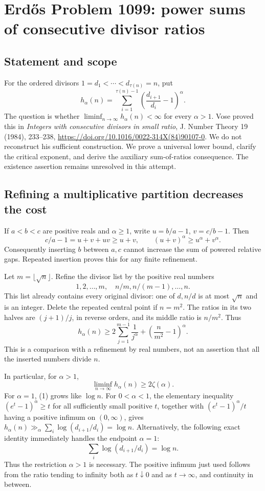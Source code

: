 \section*{Erd\H{o}s Problem 1099: power sums of consecutive divisor ratios}
\subsection*{Statement and scope}
For the ordered divisors $1=d_1<\cdots<d_{\tau(n)}=n$, put
\[
 h_\alpha(n)=\sum_{i=1}^{\tau(n)-1}\left(\frac{d_{i+1}}{d_i}-1\right)^\alpha.
\]
The question is whether $\liminf_{n\to\infty}h_\alpha(n)<\infty$ for every $\alpha>1$. Vose proved this in \emph{Integers with consecutive divisors in small ratio}, J. Number Theory 19 (1984), 233--238, \url{https://doi.org/10.1016/0022-314X(84)90107-0}. We do not reconstruct his sufficient construction. We prove a universal lower bound, clarify the critical exponent, and derive the auxiliary sum-of-ratios consequence. The existence assertion remains unresolved in this attempt.

\subsection*{Refining a multiplicative partition decreases the cost}
If $a<b<c$ are positive reals and $\alpha\ge1$, write $u=b/a-1$, $v=c/b-1$. Then
\[
 c/a-1=u+v+uv\ge u+v,\qquad (u+v)^\alpha\ge u^\alpha+v^\alpha.
\]
Consequently inserting $b$ between $a,c$ cannot increase the sum of powered relative gaps. Repeated insertion proves this for any finite refinement.

Let $m=\lfloor\sqrt n\rfloor$. Refine the divisor list by the positive real numbers
\[
 1,2,\ldots,m,\quad n/m,n/(m-1),\ldots,n.
\]
This list already contains every original divisor: one of $d,n/d$ is at most $\sqrt n$ and is an integer. Delete the repeated central point if $n=m^2$. The ratios in its two halves are $(j+1)/j$, in reverse orders, and its middle ratio is $n/m^2$. Thus
\[
 \boxed{h_\alpha(n)\ge
 2\sum_{j=1}^{m-1}\frac1{j^\alpha}
 +\left(\frac n{m^2}-1\right)^\alpha.}
 \tag{1}
\]
This is a comparison with a refinement by real numbers, not an assertion that all the inserted numbers divide $n$.

In particular, for $\alpha>1$,
\[
 \liminf_{n\to\infty}h_\alpha(n)\ge2\zeta(\alpha).
\]
For $\alpha=1$, (1) grows like $\log n$. For $0<\alpha<1$, the elementary inequality $(e^t-1)^\alpha\ge t$ for all sufficiently small positive $t$, together with $(e^t-1)^\alpha/t$ having a positive infimum on $(0,\infty)$, gives $h_\alpha(n)\gg_\alpha\sum_i\log(d_{i+1}/d_i)=\log n$. Alternatively, the following exact identity immediately handles the endpoint $\alpha=1$:
\[
 \sum_i\log(d_{i+1}/d_i)=\log n.
\]
Thus the restriction $\alpha>1$ is necessary. The positive infimum just used follows from the ratio tending to infinity both as $t\downarrow0$ and as $t\to\infty$, and continuity in between.

